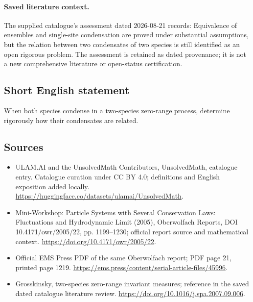 \documentclass[11pt]{article}
\begin{document}
\paragraph{Saved literature context.} The supplied catalogue's assessment dated 2026-08-21 records: Equivalence of ensembles and single-site condensation are proved under substantial assumptions, but the relation between two condensates of two species is still identified as an open rigorous problem. The assessment is retained as dated provenance; it is not a new comprehensive literature or open-status certification.
\subsection{Short English statement}
When both species condense in a two-species zero-range process, determine rigorously how their condensates are related.
\subsection{Sources}
\begin{itemize}
\item[\hypertarget{source:statement:1}{S1}] ULAM.AI and the UnsolvedMath Contributors, UnsolvedMath, catalogue entry. Catalogue curation under CC BY 4.0; definitions and English exposition added locally.
\url{https://huggingface.co/datasets/ulamai/UnsolvedMath}.
\item[\hypertarget{source:statement:2}{S2}] Mini-Workshop: Particle Systems with Several Conservation Laws: Fluctuations and Hydrodynamic Limit (2005), Oberwolfach Reports, DOI 10.4171/owr/2005/22, pp. 1199--1230; official report source and mathematical context.
\url{https://doi.org/10.4171/owr/2005/22}.
\item[\hypertarget{source:statement:3}{S3}] Official EMS Press PDF of the same Oberwolfach report; PDF page 21, printed page 1219.
\url{https://ems.press/content/serial-article-files/45996}.
\item[\hypertarget{source:statement:4}{S4}] Grosskinsky, two-species zero-range invariant measures; reference in the saved dated catalogue literature review.
\url{https://doi.org/10.1016/j.spa.2007.09.006}.
\end{itemize}
\label{end:statement}
\end{document}
